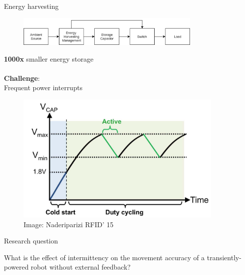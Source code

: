 \documentclass{beamer}
\begin{document}
\begin{frame}{Energy harvesting}
	\begin{figure}
		\centering
		\includegraphics[width=0.8\textwidth]{pics/Harvesting-diagram.png}
	\end{figure}
	\vspace{2em}
	\begin{minipage}{0.45\textwidth}
		\textbf{1000x} smaller energy storage \\\\
		\textbf{Challenge}: \\
		Frequent power interrupts
	\end{minipage}
	\begin{minipage}{0.54\textwidth}\raggedleft
		\begin{figure}
			\includegraphics[width=0.9\textwidth]{pics/Voltage_time_harvester.png}
			\caption*{Image: Naderiparizi RFID' 15}
		\end{figure}
	\end{minipage}
\end{frame}

\begin{frame}{Research question}
	\begin{center}
		What is the effect of intermittency on the movement accuracy of a transiently-powered robot without external feedback?
	\end{center}
\end{frame}
\end{document}
